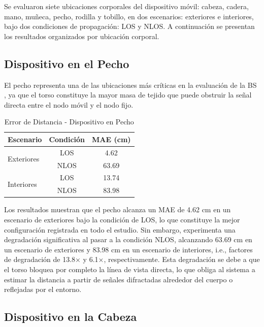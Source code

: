 Se evaluaron siete ubicaciones corporales del dispositivo móvil: cabeza, cadera, mano, muñeca, pecho, rodilla y tobillo, en dos escenarios:  exteriores e interiores, bajo dos condiciones de propagación: LOS y NLOS. A continuación se presentan los resultados organizados por ubicación corporal.

\subsection{Dispositivo en el Pecho}

El pecho representa una de las ubicaciones más críticas en la evaluación de la BS , ya que el torso constituye la mayor masa de tejido que puede obstruir la señal directa entre el nodo móvil y el nodo fijo.
%
\begin{table}[t]
\centering
\caption{Error de Distancia - Dispositivo en Pecho}
\label{tab:error_pecho}
\begin{tabular}{lcc}
\toprule
\rowcolor{headerblue}
\textbf{Escenario} & \textbf{Condición} & \textbf{MAE (cm)} \\
\midrule
\multirow{2}{*}{Exteriores}   & LOS & 4.62 \\
                            & NLOS & 63.69 \\
\midrule
\multirow{2}{*}{Interiores}   & LOS & 13.74 \\
                            & NLOS & 83.98 \\
\bottomrule
\end{tabular}
\end{table}
%
Los resultados muestran que el pecho alcanza un MAE de 4.62 cm en un escenario de exteriores bajo la condición de LOS, lo que constituye la mejor configuración registrada en todo el estudio. Sin embargo, experimenta una degradación significativa al pasar a la condición NLOS, alcanzando 63.69 cm en un escenario de exteriores y 83.98 cm en un escenario de interiores, i.e., factores de degradación de 13.8× y 6.1×, respectivamente. Esta degradación se debe a que el torso bloquea por completo la línea de vista directa, lo que obliga al sistema a estimar la distancia a partir de señales difractadas alrededor del cuerpo o reflejadas por el entorno.

\subsection{Dispositivo en la Cabeza}

